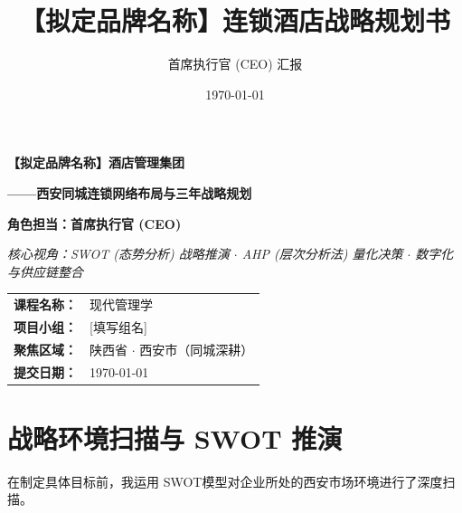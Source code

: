 \documentclass{cumcmthesis}
\title{【拟定品牌名称】连锁酒店战略规划书}
\author{首席执行官 (CEO) 汇报}
\date{\today}
\begin{document}
\begin{titlepage}
    \centering
    \vspace*{2cm}
    
    {\Huge \bfseries \color{primary} 【拟定品牌名称】酒店管理集团 \par}
    \vspace{0.5cm}
    {\Large \bfseries ——西安同城连锁网络布局与三年战略规划 \par}
    
    \vspace{2cm}
    
    {\large \textbf{角色担当：首席执行官 (CEO)} \par}
    {\small \textit{核心视角：SWOT (态势分析) 战略推演 $\cdot$ AHP (层次分析法) 量化决策 $\cdot$ 数字化与供应链整合} \par}
    
    \vspace{4cm}
    
    \begin{tabular}{l l}
        \textbf{课程名称：} & 现代管理学 \\
        \textbf{项目小组：} & [填写组名] \\
        \textbf{聚焦区域：} & 陕西省 $\cdot$ 西安市（同城深耕） \\
        \textbf{提交日期：} & \today \\
    \end{tabular}
    
    \vfill
\end{titlepage}


\newpage
\tableofcontents
\newpage

\section{战略环境扫描与 SWOT 推演}

在制定具体目标前，我运用 SWOT模型对企业所处的西安市场环境进行了深度扫描。
\end{document}
